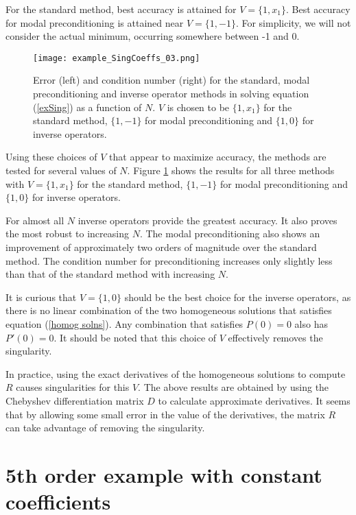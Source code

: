\documentclass{sfuthesis}
\begin{document}
For the standard method, best accuracy is attained for $V = \{1, x_1\}$.
Best accuracy for modal preconditioning is attained near $V = \{1, -1\}$.
For simplicity, we will not consider the actual minimum, occurring somewhere between -1 and 0.

\begin{figure}
\texttt{[image: example\_SingCoeffs\_03.png]}
\caption{Error (left) and condition number (right) for the standard, modal preconditioning and inverse operator methods in solving equation (\ref{exSing}) as a function of $N$. $V$ is chosen to be $\{1, x_1\}$ for the standard method, $\{1, -1\}$ for modal preconditioning and $\{1, 0\}$ for inverse operators.}
\label{fig:SingCoeffs N}
\end{figure}

Using these choices of $V$ that appear to maximize accuracy, the methods are tested for several values of $N$.
Figure \ref{fig:SingCoeffs N} shows the results for all three methods with $V = \{1, x_1\}$ for the standard method, $\{1, -1\}$ for modal preconditioning and $\{1, 0\}$ for inverse operators.

For almost all $N$ inverse operators provide the greatest accuracy.
It also proves the most robust to increasing $N$.
The modal preconditioning also shows an improvement of approximately two orders of magnitude over the standard method.
The condition number for preconditioning increases only slightly less than that of the standard method with increasing $N$.

It is curious that $V = \{1, 0\}$ should be the best choice for the inverse operators,
as there is no linear combination of the two homogeneous solutions that satisfies equation (\ref{homog solns}).
Any combination that satisfies $P(0) = 0$ also has $P'(0) = 0$.
It should be noted that this choice of $V$ effectively removes the singularity.

In practice, using the exact derivatives of the homogeneous solutions to compute $R$ causes singularities for this $V$.
The above results are obtained by using the Chebyshev differentiation matrix $D$ to calculate approximate derivatives.
It seems that by allowing some small error in the value of the derivatives, the matrix $R$ can take advantage of removing the singularity.

\section{5th order example with constant coefficients}
\end{document}

